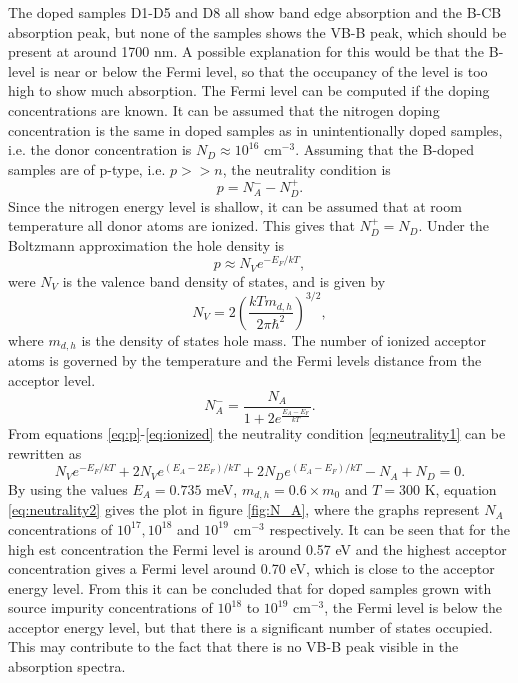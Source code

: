 The doped samples D1-D5 and D8 all show band edge absorption and the B-CB absorption peak, but none of the samples shows the VB-B peak, which should be present at around 1700 nm. A possible explanation for this would be that the B-level is near or below the Fermi level, so that the occupancy of the level is too high to show much absorption. The Fermi level can be computed if the doping concentrations are known. It can be assumed that the nitrogen doping concentration is the same in doped samples as in unintentionally doped samples, i.e. the donor concentration is $N_D \approx 10^{16}$ cm$^{-3}$. Assuming that the B-doped samples are of p-type, i.e. $p>>n$, the neutrality condition is
\begin{equation}
\label{eq:neutrality1}
p = N_A^- - N_D^+.
\end{equation}
Since the nitrogen energy level is shallow, it can be assumed that at room temperature all donor atoms are ionized. This gives that $N_D^+ =N_D$. Under the Boltzmann approximation the hole density is
\begin{equation}
\label{eq:p}
p \approx N_Ve^{-E_F/kT},
\end{equation}
were $N_V$ is the valence band density of states, and is given by
\begin{equation}
\label{eq:nv}
N_V = 2\left(\frac{kTm_{d,h}}{2\pi \hbar^2}\right)^{3/2},
\end{equation}
where $m_{d,h}$ is the density of states hole mass. The number of ionized acceptor atoms is governed by the temperature and the Fermi levels distance from the acceptor level. 
\begin{equation}
\label{eq:ionized}
N_A^- = \frac{N_A}{1+2e^{\frac{E_A-E_F}{kT}}}.
\end{equation}
From equations \ref{eq:p}-\ref{eq:ionized} the neutrality condition \ref{eq:neutrality1} can be rewritten as
\begin{equation}
\label{eq:neutrality2}
N_Ve^{-E_F/kT}+2N_Ve^{(E_A-2E_F)/kT}+2N_De^{(E_A-E_F)/kT} - N_A + N_D = 0.
\end{equation}
By using the values $E_A = 0.735$ meV, $m_{d,h} = 0.6\times m_0$ and $T = 300$ K, equation \ref{eq:neutrality2} gives the plot in figure \ref{fig:N_A}, where the graphs represent $N_A$ concentrations of $10^{17}, 10^{18}$ and $10^{19}$ cm$^{-3}$ respectively. It can be seen that for the high est concentration the Fermi level is around 0.57 eV and the highest acceptor concentration gives a Fermi level around 0.70 eV, which is close to the acceptor energy level. From this it can be concluded that for doped samples grown with source impurity concentrations of $10^{18}$ to $10^{19}$ cm$^{-3}$, the Fermi level is below the acceptor energy level, but that there is a significant number of states occupied. This may contribute to the fact that there is no VB-B peak visible in the absorption spectra. 

